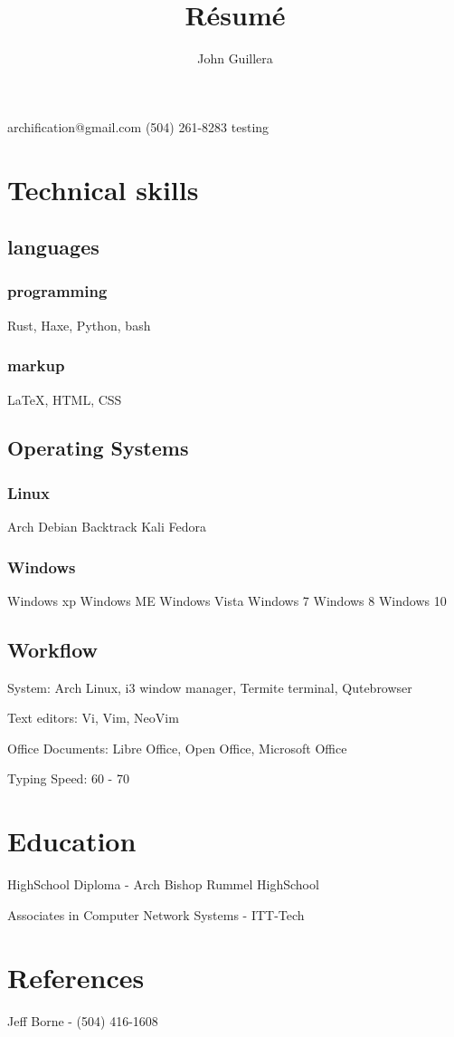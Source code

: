 \documentclass{article}
\makeatletter
\renewcommand{\maketitle}{
\begin{center}
{\huge\bfseries\theauthor}

\vspace{.25em}

archification@gmail.com
\linebreak
(504) 261-8283
\linebreak
testing

\end{center}
}
\makeatother
\begin{document}
\title{R\'esum\'e}
\author{John Guillera}

\maketitle

\section{Technical skills}

\subsection{languages}

\subsubsection{programming}

Rust, Haxe, Python, bash

\subsubsection{markup}

{\LaTeX}, HTML, CSS

\subsection{Operating Systems}

\subsubsection{Linux}

Arch
Debian
Backtrack
Kali
Fedora

\subsubsection{Windows}

Windows xp
Windows ME
Windows Vista
Windows 7
Windows 8
Windows 10

\subsection{Workflow}

System: Arch Linux, i3 window manager, Termite terminal, Qutebrowser

Text editors: Vi, Vim, NeoVim

Office Documents: Libre Office, Open Office, Microsoft Office

Typing Speed: 60 - 70

\section{Education}

HighSchool Diploma - Arch Bishop Rummel HighSchool

Associates in Computer Network Systems - ITT-Tech

\section{References}

Jeff Borne - (504) 416-1608
\end{document}

